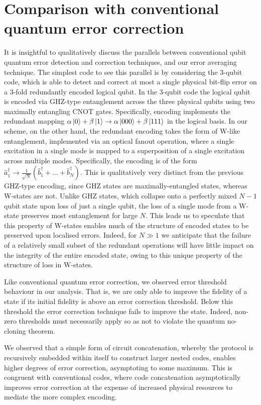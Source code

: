 \documentclass[aps,pra,twocolumn,superscriptaddress,numerical,floatfix]{revtex4-1}
\begin{document}
\section{Comparison with conventional quantum error correction \label{Comparison with conventional error correction}}

It is insightful to qualitatively discuss the parallels between conventional qubit quantum error detection and correction techniques, and our error averaging technique. The simplest code to see this parallel is by considering the 3-qubit code, which is able to detect and correct at most a single physical bit-flip error on a 3-fold redundantly encoded logical qubit. In the 3-qubit code the logical qubit is encoded via GHZ-type entanglement across the three physical qubits using two maximally entangling CNOT gates. 
Specifically, encoding implements the redundant mapping $\alpha\ket{0} + \beta\ket{1} \to \alpha\ket{000} + \beta\ket{111}$ in the logical basis. In our scheme, on the other hand, the redundant encoding takes the form of W-like entanglement, implemented via an optical fanout operation, where a single excitation in a single mode is mapped to a superposition of a single excitation across multiple modes. Specifically, the encoding is of the form $\hat{a}_1^\dag \to \frac{1}{\sqrt{N}}(\hat{b}_1^\dag + \dots + \hat{b}_N^\dag)$. This is qualitatively very distinct from the previous GHZ-type encoding, since GHZ states are maximally-entangled states, whereas W-states are not. Unlike GHZ states, which collapse onto a perfectly mixed $N-1$ qubit state upon loss of just a single qubit, the loss of a single mode from a W-state preserves most entanglement for large $N$. This leads us to speculate that this property of W-states enables much of the structure of encoded states to be preserved upon localised errors. Indeed, for $N\gg 1$ we anticipate that the failure of a relatively small subset of the redundant operations will have little impact on the integrity of the entire encoded state, owing to this unique property of the structure of loss in W-states.

Like conventional quantum error correction, we observed error threshold behaviour in our analysis. That is, we are only able to improve the fidelity of a state if its initial fidelity is above an error correction threshold. Below this threshold the error correction technique fails to improve the state. Indeed, non-zero thresholds must necessarily apply so as not to violate the quantum no-cloning theorem.

We observed that a simple form of circuit concatenation, whereby the protocol is recursively embedded within itself to construct larger nested codes, enables higher degrees of error correction, asymptoting to some maximum. This is congruent with conventional codes, where code concatenation asymptotically improves error correction at the expense of increased physical resources to mediate the more complex encoding.
\end{document}

